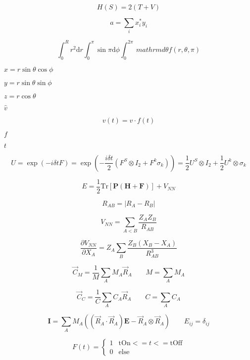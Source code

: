 \documentclass{article}
\begin{document}
\[ H(S) = 2(T + V) \]
\pagebreak

\[ a = \sum_i x_i^* y_i \]
\pagebreak

\[ \int_0^R r^2 \mathrm{d}r \int_0^\pi \sin\pi \mathrm{d}\phi \int_0^{2\pi}\ mathrm{d}\theta f(r,\theta,\pi) \]
\pagebreak

$ x = r \sin\theta \cos\phi $
\pagebreak

$ y = r \sin\theta \sin\phi $
\pagebreak

$ z = r \cos\theta $
\pagebreak

$ \hat{v} $
\pagebreak

\[ v(t) = \hat{v} \cdot f(t) \]
\pagebreak

$ f $
\pagebreak

$ t $
\pagebreak

\[ U = \exp\left( -i \delta t F \right) = \exp\left( -\frac{i\delta t}{2} \left(F^S \otimes I_2 + F^k \sigma_k\right) \right) = \frac{1}{2}U^S \otimes I_2 + \frac{1}{2} U^k \otimes \sigma_k \]
\pagebreak

\[ E = \frac{1}{2} \mathrm{Tr}[\mathbf{P}(\mathbf{H} + \mathbf{F})] + V_{NN} \]
\pagebreak

\[ R_{AB} = \vert R_A - R_B \vert \]
\pagebreak

\[ V_{NN} = \sum_{A < B} \frac{Z_A Z_B}{R_{AB}} \]
\pagebreak

\[ \frac{\partial V_{NN}}{\partial X_A} = Z_A \sum_B \frac{Z_B (X_B - X_A)}{R_{AB}^3} \]
\pagebreak

\[ \vec{C}_M = \frac{1}{M} \sum_A M_A \vec{R}_A \qquad M = \sum_A M_A \]
\pagebreak

\[ \vec{C}_C = \frac{1}{C} \sum_A C_A \vec{R}_A \qquad C = \sum_A C_A \]
\pagebreak

\[ \mathbf{I} = \sum_A M_A \left( \left(\vec{R}_A \cdot \vec{R}_A \right)\mathbf{E} - \vec{R}_A \otimes \vec{R}_A \right) \qquad E_{ij} = \delta_{ij} \]
\pagebreak

\[ F(t) = \begin{cases} 1 & \mathrm{tOn} <= t <= \mathrm{tOff} \\ 0 & \mathrm{else} \end{cases} \]
\pagebreak
\end{document}
